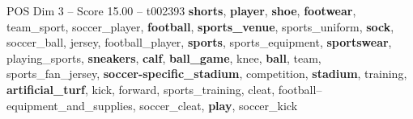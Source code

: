 \begin{textsample}{POS Dim 3 – Score 15.00 – t002393}  \label{ex:f3_pos_029}
\textbf{shorts}, \textbf{player}, \textbf{shoe}, \textbf{footwear}, team\_sport, soccer\_player, \textbf{football}, \textbf{sports\_venue}, sports\_uniform, \textbf{sock}, soccer\_ball, jersey, football\_player, \textbf{sports}, sports\_equipment, \textbf{sportswear}, playing\_sports, \textbf{sneakers}, \textbf{calf}, \textbf{ball\_game}, knee, \textbf{ball}, team, sports\_fan\_jersey, \textbf{soccer-specific\_stadium}, competition, \textbf{stadium}, training, \textbf{artificial\_turf}, kick, forward, sports\_training, cleat, football--equipment\_and\_supplies, soccer\_cleat, \textbf{play}, soccer\_kick

\end{textsample}
